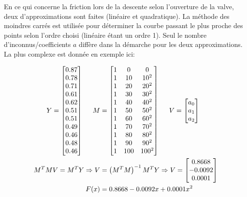 En ce qui concerne la friction lors de la descente selon l'ouverture de la valve,
deux d'approximations  sont faites (linéaire et quadratique). La méthode des
moindres carrés est utilisée pour déterminer la courbe passant le plus proche
des points selon l'ordre choisi (linéaire étant un ordre 1). Seul le
nombre d'inconnus/coefficients $a$ diffère dans la démarche pour les deux
approximations. La plus complexe est donnée en exemple ici:

{\footnotesize
\begin{align}
	Y = \begin{bmatrix} 0.87\\0.78\\0.71\\0.61\\0.62
	\\0.51\\0.51\\0.49\\0.46\\0.48\\0.46 \end{bmatrix}\hspace{.5cm}
		M &=
	\begin{bmatrix}
	1 &0   &0  \\
	1 &10  &10^2  \\
	1 &20  &20^2  \\
	1 &30  &30^2  \\
	1 &40  &40^2  \\
	1 &50  &50^2  \\
	1 &60  &60^2  \\
	1 &70  &70^2  \\
	1 &80  &80^2  \\
	1 &90  &90^2  \\
	1 &100 &100^2 \\
	\end{bmatrix}\hspace{.5cm}
	V =
	\begin{bmatrix} a_0\\a_1\\a_2 \end{bmatrix} \\
	M^T MV = M^T Y \Rightarrow
	V &= \left( M^T M \right)^{-1} M^T Y \Rightarrow
	V =
	\begin{bmatrix} 0.8668\\-0.0092\\0.0001 \end{bmatrix} \\
		F(x) &= 0.8668 -0.0092x + 0.0001 x^2
		\label{eq:valve-quad}
\end{align}}

